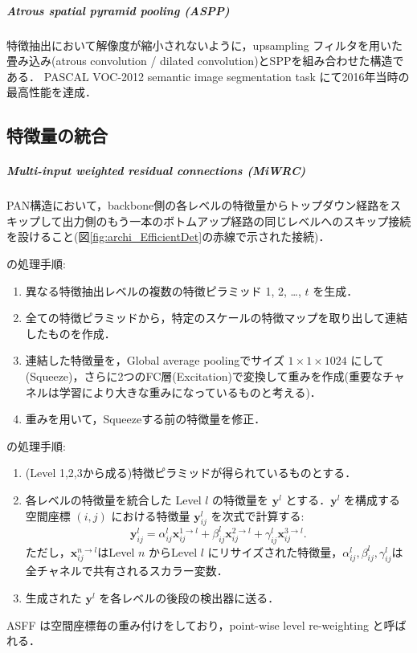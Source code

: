 \documentclass[twocolumn]{jsarticle} %
\newcommand{\vect}[1]{\boldsymbol #1}
\begin{document}
\subparagraph{Atrous spatial pyramid pooling (ASPP) \cite{CPKMY17}} 特徴抽出において解像度が縮小されないように，upsampling フィルタを用いた畳み込み(atrous convolution / dilated convolution)とSPPを組み合わせた構造である．
PASCAL VOC-2012 semantic image segmentation task にて2016年当時の最高性能を達成．

\subsection{特徴量の統合}
\subparagraph{Multi-input weighted residual connections (MiWRC)\cite{TPL20}} PAN構造において，backbone側の各レベルの特徴量からトップダウン経路をスキップして出力側のもう一本のボトムアップ経路の同じレベルへのスキップ接続を設けること(図\ref{fig:archi_EfficientDet}の赤線で示された接続)．

 \cite{ZSWTCCL19} の処理手順:
\begin{enumerate}
    \item 異なる特徴抽出レベルの複数の特徴ピラミッド 1, 2, …, $t$ を生成．
    \item 全ての特徴ピラミッドから，特定のスケールの特徴マップを取り出して連結したものを作成．
    \item 連結した特徴量を，Global average poolingでサイズ $1{\times}1{\times}1024$ にして(Squeeze)，さらに2つのFC層(Excitation)で変換して重みを作成(重要なチャネルは学習により大きな重みになっているものと考える)．
    \item 重みを用いて，Squeezeする前の特徴量を修正．
\end{enumerate}

 \cite{LHW19}の処理手順:
\newcommand{\yb}[2]{\boldsymbol{y}^{#1}_{#2}}
\newcommand{\xb}[2]{\boldsymbol{x}^{#1}_{#2}}
\begin{enumerate}
    \item (Level 1,2,3から成る)特徴ピラミッドが得られているものとする．
    \item 各レベルの特徴量を統合した Level $l$ の特徴量を $\vect{y}^l$ とする．$\vect{y}^l$ を構成する空間座標 $(i,j)$ における特徴量 $\yb{l}{ij}$ を次式で計算する: $$ \yb{l}{ij} = \alpha^l_{ij}\xb{1{\rightarrow}l}{ij} + \beta^l_{ij}\xb{2{\rightarrow}l}{ij} + \gamma^l_{ij}\xb{3{\rightarrow}l}{ij}. $$ ただし，$\xb{n{\rightarrow}l}{ij}$はLevel $n$ からLevel $l$ にリサイズされた特徴量，$\alpha^l_{ij},\beta^l_{ij},\gamma^l_{ij}$は全チャネルで共有されるスカラー変数．
    \item 生成された $\vect{y}^l$ を各レベルの後段の検出器に送る．
\end{enumerate}
ASFF は空間座標毎の重み付けをしており，point-wise level re-weighting と呼ばれる．
\end{document}
